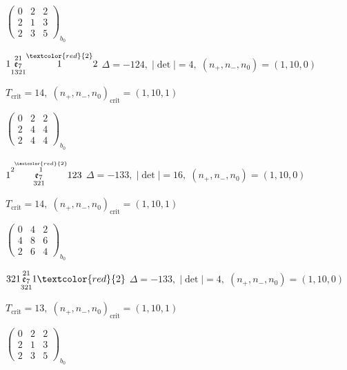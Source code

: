 \documentclass[10pt]{article}
\begin{document}
\hspace{2em}$\left(\begin{smallmatrix}0 & 2 & 2 \\ 2 & 1 & 3 \\ 2 & 3 & 5\end{smallmatrix}\right)_{\!b_0}$

\smallskip

$1\overset{21}{\underset{1321}{\mathfrak{e}_7}}\overset{\textcolor{red}{2}}{1}2$ \quad $\Delta=-124,\; |\det|=4,\; (n_+,n_-,n_0)=(1,10,0)$

\hspace{1em}$T_{\text{crit}}=14,\; (n_+,n_-,n_0)_{\text{crit}}=(1,10,1)$

\hspace{2em}$\left(\begin{smallmatrix}0 & 2 & 2 \\ 2 & 4 & 4 \\ 2 & 4 & 4\end{smallmatrix}\right)_{\!b_0}$

\smallskip

$1\overset{2\overset{\textcolor{red}{2}}{1}}{\underset{321}{\mathfrak{e}_7}}123$ \quad $\Delta=-133,\; |\det|=16,\; (n_+,n_-,n_0)=(1,10,0)$

\hspace{1em}$T_{\text{crit}}=14,\; (n_+,n_-,n_0)_{\text{crit}}=(1,10,1)$

\hspace{2em}$\left(\begin{smallmatrix}0 & 4 & 2 \\ 4 & 8 & 6 \\ 2 & 6 & 4\end{smallmatrix}\right)_{\!b_0}$

$321\overset{21}{\underset{321}{\mathfrak{e}_7}}1\textcolor{red}{2}$ \quad $\Delta=-133,\; |\det|=4,\; (n_+,n_-,n_0)=(1,10,0)$

\hspace{1em}$T_{\text{crit}}=13,\; (n_+,n_-,n_0)_{\text{crit}}=(1,10,1)$

\hspace{2em}$\left(\begin{smallmatrix}0 & 2 & 2 \\ 2 & 1 & 3 \\ 2 & 3 & 5\end{smallmatrix}\right)_{\!b_0}$
\end{document}
